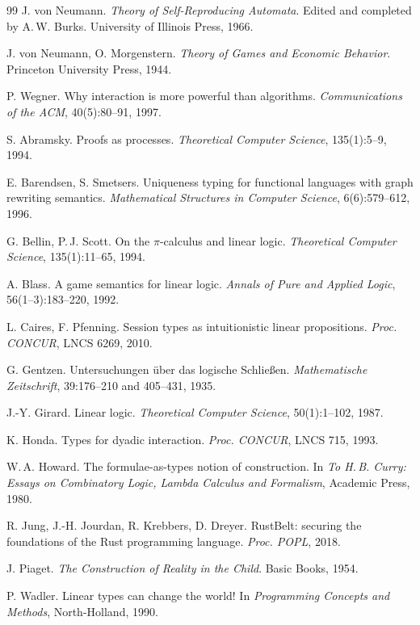 \documentclass[11pt,a4paper]{article}
\begin{document}
\begin{thebibliography}{99}
 J. von Neumann. \emph{Theory of Self-Reproducing
Automata}. Edited and completed by A.\,W. Burks. University of Illinois Press,
1966.

 J. von Neumann, O. Morgenstern. \emph{Theory of Games and
Economic Behavior}. Princeton University Press, 1944.

 P. Wegner. Why interaction is more powerful than algorithms.
\emph{Communications of the ACM}, 40(5):80--91, 1997.

 S. Abramsky. Proofs as processes. \emph{Theoretical
Computer Science}, 135(1):5--9, 1994.

 E. Barendsen, S. Smetsers. Uniqueness typing for
functional languages with graph rewriting semantics. \emph{Mathematical
Structures in Computer Science}, 6(6):579--612, 1996.

 G. Bellin, P.\,J. Scott. On the $\pi$-calculus and
linear logic. \emph{Theoretical Computer Science}, 135(1):11--65, 1994.

 A. Blass. A game semantics for linear logic. \emph{Annals of
Pure and Applied Logic}, 56(1--3):183--220, 1992.

 L. Caires, F. Pfenning. Session types as
intuitionistic linear propositions. \emph{Proc. CONCUR}, LNCS 6269, 2010.

 G. Gentzen. Untersuchungen \"uber das logische Schlie{\ss}en.
\emph{Mathematische Zeitschrift}, 39:176--210 and 405--431, 1935.

 J.-Y. Girard. Linear logic. \emph{Theoretical Computer
Science}, 50(1):1--102, 1987.

 K. Honda. Types for dyadic interaction. \emph{Proc. CONCUR},
LNCS 715, 1993.

 W.\,A. Howard. The formulae-as-types notion of construction.
In \emph{To H.\,B. Curry: Essays on Combinatory Logic, Lambda Calculus and
Formalism}, Academic Press, 1980.

 R. Jung, J.-H. Jourdan, R. Krebbers, D. Dreyer. RustBelt:
securing the foundations of the Rust programming language. \emph{Proc. POPL},
2018.

 J. Piaget. \emph{The Construction of Reality in the Child}.
Basic Books, 1954.

 P. Wadler. Linear types can change the world! In
\emph{Programming Concepts and Methods}, North-Holland, 1990.


\end{thebibliography}
\end{document}

